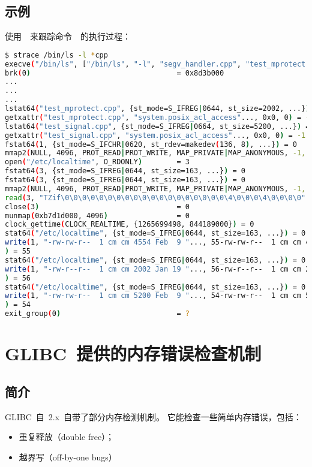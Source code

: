 \subsection{示例}
使用~~来跟踪命令~~的执行过程：\\
\begin{lstlisting}[language={sh}]
$ strace /bin/ls -l *cpp
execve("/bin/ls", ["/bin/ls", "-l", "segv_handler.cpp", "test_mprotect.cpp", "test_signal.cpp"], [/* 42 vars */]) = 0
brk(0)                                  = 0x8d3b000
...
...
...
lstat64("test_mprotect.cpp", {st_mode=S_IFREG|0644, st_size=2002, ...}) = 0
getxattr("test_mprotect.cpp", "system.posix_acl_access"..., 0x0, 0) = -1 EOPNOTSUPP (Operation not supported)
lstat64("test_signal.cpp", {st_mode=S_IFREG|0664, st_size=5200, ...}) = 0
getxattr("test_signal.cpp", "system.posix_acl_access"..., 0x0, 0) = -1 EOPNOTSUPP (Operation not supported)
fstat64(1, {st_mode=S_IFCHR|0620, st_rdev=makedev(136, 8), ...}) = 0
mmap2(NULL, 4096, PROT_READ|PROT_WRITE, MAP_PRIVATE|MAP_ANONYMOUS, -1, 0) = 0xb7d1e000
open("/etc/localtime", O_RDONLY)        = 3
fstat64(3, {st_mode=S_IFREG|0644, st_size=163, ...}) = 0
fstat64(3, {st_mode=S_IFREG|0644, st_size=163, ...}) = 0
mmap2(NULL, 4096, PROT_READ|PROT_WRITE, MAP_PRIVATE|MAP_ANONYMOUS, -1, 0) = 0xb7d1d000
read(3, "TZif\0\0\0\0\0\0\0\0\0\0\0\0\0\0\0\0\0\0\0\4\0\0\0\4\0\0\0\0"..., 4096) = 163
close(3)                                = 0
munmap(0xb7d1d000, 4096)                = 0
clock_gettime(CLOCK_REALTIME, {1265699498, 844189000}) = 0
stat64("/etc/localtime", {st_mode=S_IFREG|0644, st_size=163, ...}) = 0
write(1, "-rw-rw-r--  1 cm cm 4554 Feb  9 "..., 55-rw-rw-r--  1 cm cm 4554 Feb  9 11:52 segv_handler.cpp
) = 55
stat64("/etc/localtime", {st_mode=S_IFREG|0644, st_size=163, ...}) = 0
write(1, "-rw-r--r--  1 cm cm 2002 Jan 19 "..., 56-rw-r--r--  1 cm cm 2002 Jan 19 11:36 test_mprotect.cpp
) = 56
stat64("/etc/localtime", {st_mode=S_IFREG|0644, st_size=163, ...}) = 0
write(1, "-rw-rw-r--  1 cm cm 5200 Feb  9 "..., 54-rw-rw-r--  1 cm cm 5200 Feb  9 11:49 test_signal.cpp
) = 54
exit_group(0)                           = ?
\end{lstlisting}

\section{GLIBC~提供的内存错误检查机制}
\subsection{简介}
GLIBC~自~2.x~自带了部分内存检测机制。
它能检查一些简单内存错误，包括：
\begin{itemize}
\item 重复释放（double free）；
\item 越界写（off-by-one bugs）
\end{itemize}

